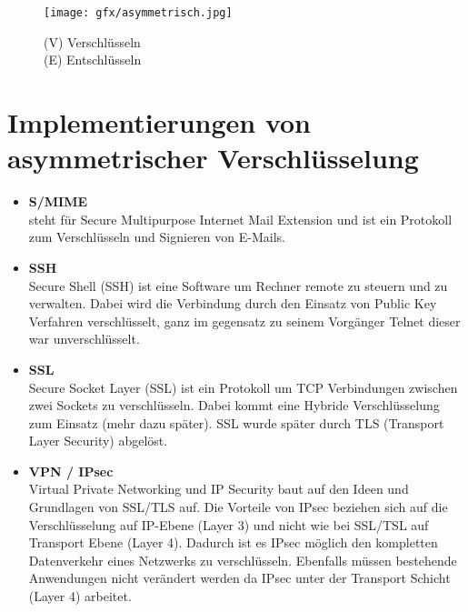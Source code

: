 \begin{figure}[ht]
	\centering
  \texttt{[image: gfx/asymmetrisch.jpg]}
	\caption{(V) Verschlüsseln\\(E) Entschlüsseln}
\end{figure}
\newpage

\section{Implementierungen von asymmetrischer Verschlüsselung}

\begin{itemize}
    \item \textbf{S/MIME}\\steht für Secure Multipurpose Internet Mail Extension und ist ein Protokoll zum Verschlüsseln und Signieren von E-Mails.\citep{ERTEL:2020}
    \item \textbf{SSH}\\Secure Shell (SSH) ist eine Software um Rechner remote zu steuern und zu verwalten. Dabei wird die Verbindung durch den Einsatz von Public Key Verfahren verschlüsselt, ganz im gegensatz zu seinem Vorgänger Telnet dieser war unverschlüsselt.\citep{ERTEL:2020}
    \item \textbf{SSL}\\ Secure Socket Layer (SSL) ist ein Protokoll um TCP Verbindungen zwischen zwei Sockets zu verschlüsseln. 
    Dabei kommt eine Hybride Verschlüsselung zum Einsatz (mehr dazu später). SSL wurde später durch TLS (Transport Layer Security) abgelöst.\citep{ERTEL:2020}
    \item \textbf{VPN / IPsec}\\Virtual Private Networking und IP Security baut auf den Ideen und Grundlagen von SSL/TLS auf.
    Die Vorteile von IPsec beziehen sich auf die Verschlüsselung auf IP-Ebene (Layer 3) und nicht wie bei SSL/TSL auf Transport Ebene (Layer 4).
    Dadurch ist es IPsec möglich den kompletten Datenverkehr eines Netzwerks zu verschlüsseln. Ebenfalls müssen bestehende Anwendungen nicht verändert werden da IPsec unter der Transport Schicht (Layer 4) arbeitet.\citep{ERTEL:2020}
\end{itemize}